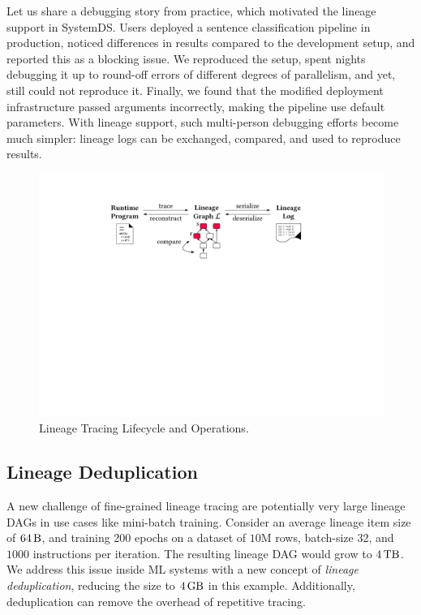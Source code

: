 \begin{example} Let us share a debugging story from practice, which motivated the lineage support in SystemDS. Users deployed a sentence classification pipeline in production, noticed differences in results compared to the development setup, and reported this as a blocking issue. We reproduced the setup, spent nights debugging it up to round-off errors of different degrees of parallelism, and yet, still could not reproduce it. Finally, we found that the modified deployment infrastructure passed arguments incorrectly, making the pipeline use default parameters. With lineage support, such multi-person debugging efforts become much simpler: lineage logs can be exchanged, compared, and used to reproduce results.
\end{example}

\begin{figure}[!t]
	\centering
	\includegraphics[scale=0.32]{figures/lineage}
	\vspace{-0.25cm}
	\caption{\label{fig:lineage}Lineage Tracing Lifecycle and Operations.}
\end{figure}

\subsection{Lineage Deduplication}
\label{sec:deduplication}

A new challenge of fine-grained lineage tracing are potentially very large lineage DAGs in use cases like mini-batch training. Consider an average lineage item size of $64\bb$, and training 200 epochs on a dataset of $10\text{M}$ rows, batch-size 32, and $\num{1000}$ instructions per iteration. The resulting lineage DAG would grow to $4\tb$. We address this issue inside ML systems with a new concept of \emph{lineage deduplication}, reducing the size to $4\gb$ in this example. Additionally, deduplication can remove the overhead of repetitive tracing.

